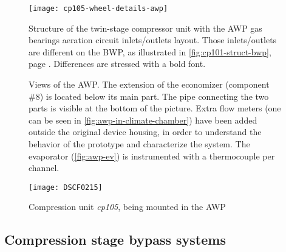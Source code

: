 \begin{figure}[htbp]
  \centering
  \texttt{[image: cp105-wheel-details-awp]}
  \caption[Structure of the compressor unit with the AWP gas bearings
  aeration circuit I/O layout]{Structure of the twin-stage compressor
    unit with the AWP gas bearings aeration circuit inlets/outlets
    layout. Those inlets/outlets are different on the BWP, as
    illustrated in \cref{fig:cp101-struct-bwp}, page
    \pageref{fig:cp101-struct-bwp}.  Differences are stressed with a
    bold font.}
  \label{fig:cp105-struct-awp}
\end{figure}

\begin{figure}[htbp]
  \centering
  \hspace{1em}
  \caption[Views of the AWP]{Views of the AWP. The extension of the
    economizer (component \#8) is located below its main part. The
    pipe connecting the two parts is visible at the bottom of the
    picture. Extra flow meters (one can be seen in
    \cref{fig:awp-in-climate-chamber}) have been added outside the
    original device housing, in order to understand the behavior of
    the prototype and characterize the system. The evaporator
    (\cref{fig:awp-ev}) is instrumented with a thermocouple per
    channel.}
  \label{fig:awp-views-in-climate-chamber}
\end{figure}

\begin{figure}[htbp]
  \centering
  \texttt{[image: DSCF0215]}
  \caption{Compression unit \textit{cp105}, being mounted in the AWP}
  \label{fig:cp105-being-mounted-in-awp}
\end{figure}


\subsection{Compression stage bypass systems}
\label{sec:awp-bypass}

